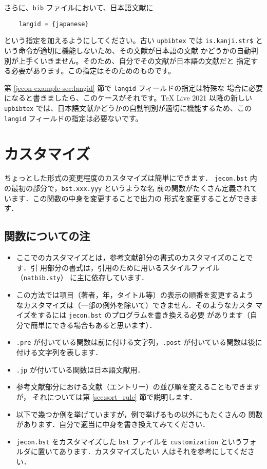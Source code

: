 \documentclass[article]{jlreq}
\begin{document}
さらに、\texttt{bib} ファイルにおいて、日本語文献に
\begin{screen}
\begin{verbatim}
	langid = {japanese}
\end{verbatim}
\end{screen}
という指定を加えるようにしてください。古い \texttt{upbibtex} では
\texttt{is.kanji.str\$} という命令が適切に機能しないため、その文献が日本語の文献
かどうかの自動判別が上手くいきません。そのため、自分でその文献が日本語の文献だと
指定する必要があります。この指定はそのためのものです。

第 \ref{jecon-example-sec:langid} 節で \texttt{langid} フィールドの指定は特殊な
場合に必要になると書きましたら、このケースがそれです。TeX Live 2021 以降の新しい
\texttt{upbibtex} では、日本語文献かどうかの自動判別が適切に機能するため、この
\texttt{langid} フィールドの指定は必要ないです。


\section{カスタマイズ}

ちょっとした形式の変更程度のカスタマイズは簡単にできます．
\texttt{jecon.bst} 内の最初の部分で，\texttt{bst.xxx.yyy} というような名
前の関数がたくさん定義されています．この関数の中身を変更することで出力の
形式を変更することができます．

\subsection{関数についての注}

\begin{itemize}
 \item ここでのカスタマイズとは，参考文献部分の書式のカスタマイズのことです．引
       用部分の書式は，引用のために用いるスタイルファイル（\texttt{natbib.sty}）
       に主に依存しています．
 \item この方法では項目（著者，年，タイトル等）の表示の順番を変更するよう
       なカスタマイズは（一部の例外を除いて）できません．そのようなカスタ
       マイズをするには \texttt{jecon.bst} のプログラムを書き換える必要
       があります（自分で簡単にできる場合もあると思います）．
 \item \texttt{.pre} が付いている関数は前に付ける文字列，\texttt{.post} 
       が付いている関数は後に付ける文字列を表します．
 \item \texttt{.jp} が付いている関数は日本語文献用．
 \item 参考文献部分における文献（エントリー）の並び順を変えることもできますが，
       それについては第 \ref{sec:sort_rule} 節で説明します．
 \item 以下で幾つか例を挙げていますが，例で挙げるもの以外にもたくさんの
       関数があります．自分で適当に中身を書き換えてみてください．
 \item \texttt{jecon.bst} をカスタマイズした \texttt{bst} ファイルを
       \texttt{customization} というフォルダに置いてあります．カスタマイズしたい
       人はそれを参考にしてください．
\end{itemize}
\end{document}
